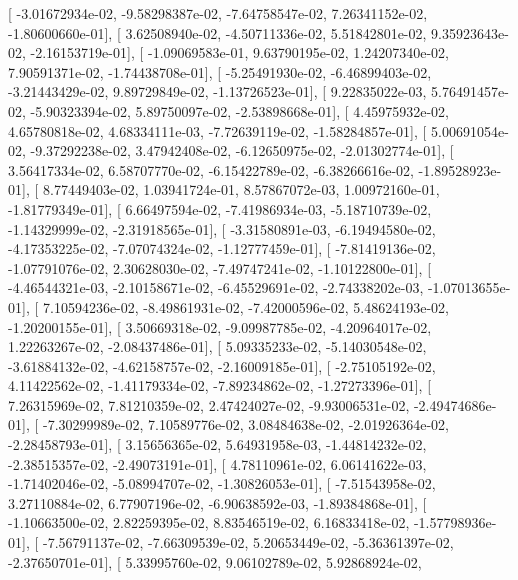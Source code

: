 \documentclass{article}
\begin{document}
       [ -3.01672934e-02,  -9.58298387e-02,  -7.64758547e-02,
          7.26341152e-02,  -1.80600660e-01],
       [  3.62508940e-02,  -4.50711336e-02,   5.51842801e-02,
          9.35923643e-02,  -2.16153719e-01],
       [ -1.09069583e-01,   9.63790195e-02,   1.24207340e-02,
          7.90591371e-02,  -1.74438708e-01],
       [ -5.25491930e-02,  -6.46899403e-02,  -3.21443429e-02,
          9.89729849e-02,  -1.13726523e-01],
       [  9.22835022e-03,   5.76491457e-02,  -5.90323394e-02,
          5.89750097e-02,  -2.53898668e-01],
       [  4.45975932e-02,   4.65780818e-02,   4.68334111e-03,
         -7.72639119e-02,  -1.58284857e-01],
       [  5.00691054e-02,  -9.37292238e-02,   3.47942408e-02,
         -6.12650975e-02,  -2.01302774e-01],
       [  3.56417334e-02,   6.58707770e-02,  -6.15422789e-02,
         -6.38266616e-02,  -1.89528923e-01],
       [  8.77449403e-02,   1.03941724e-01,   8.57867072e-03,
          1.00972160e-01,  -1.81779349e-01],
       [  6.66497594e-02,  -7.41986934e-03,  -5.18710739e-02,
         -1.14329999e-02,  -2.31918565e-01],
       [ -3.31580891e-03,  -6.19494580e-02,  -4.17353225e-02,
         -7.07074324e-02,  -1.12777459e-01],
       [ -7.81419136e-02,  -1.07791076e-02,   2.30628030e-02,
         -7.49747241e-02,  -1.10122800e-01],
       [ -4.46544321e-03,  -2.10158671e-02,  -6.45529691e-02,
         -2.74338202e-03,  -1.07013655e-01],
       [  7.10594236e-02,  -8.49861931e-02,  -7.42000596e-02,
          5.48624193e-02,  -1.20200155e-01],
       [  3.50669318e-02,  -9.09987785e-02,  -4.20964017e-02,
          1.22263267e-02,  -2.08437486e-01],
       [  5.09335233e-02,  -5.14030548e-02,  -3.61884132e-02,
         -4.62158757e-02,  -2.16009185e-01],
       [ -2.75105192e-02,   4.11422562e-02,  -1.41179334e-02,
         -7.89234862e-02,  -1.27273396e-01],
       [  7.26315969e-02,   7.81210359e-02,   2.47424027e-02,
         -9.93006531e-02,  -2.49474686e-01],
       [ -7.30299989e-02,   7.10589776e-02,   3.08484638e-02,
         -2.01926364e-02,  -2.28458793e-01],
       [  3.15656365e-02,   5.64931958e-03,  -1.44814232e-02,
         -2.38515357e-02,  -2.49073191e-01],
       [  4.78110961e-02,   6.06141622e-03,  -1.71402046e-02,
         -5.08994707e-02,  -1.30826053e-01],
       [ -7.51543958e-02,   3.27110884e-02,   6.77907196e-02,
         -6.90638592e-03,  -1.89384868e-01],
       [ -1.10663500e-02,   2.82259395e-02,   8.83546519e-02,
          6.16833418e-02,  -1.57798936e-01],
       [ -7.56791137e-02,  -7.66309539e-02,   5.20653449e-02,
         -5.36361397e-02,  -2.37650701e-01],
       [  5.33995760e-02,   9.06102789e-02,   5.92868924e-02,
\end{document}
